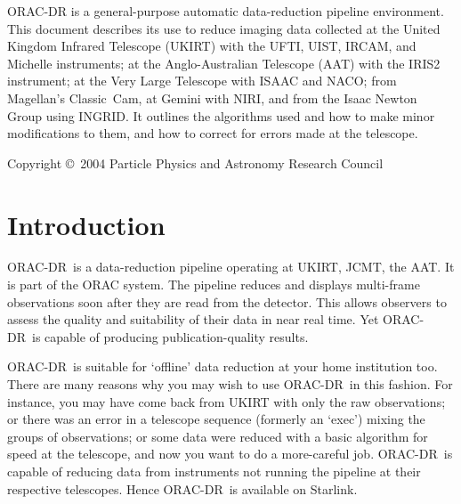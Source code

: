 \documentclass[twoside,11pt]{article}
\newcommand{\stardocinitials}  {SUN}
\newcommand{\stardocnumber}    {232.8}
\newcommand{\stardoccopyright} {Copyright \copyright\ 2004 Particle Physics and Astronomy Research Council}
\newcommand{\stardocabstract}  {{\footnotesize ORAC-DR} is a
general-purpose automatic data-reduction pipeline environment.  This
document describes its use to reduce imaging data collected at the
United Kingdom Infrared Telescope (UKIRT) with the UFTI, UIST, IRCAM,
and Michelle instruments; at the Anglo-Australian Telescope (AAT) with
the IRIS2 instrument; at the Very Large Telescope with ISAAC and NACO;
from Magellan's Classic~Cam, at Gemini with NIRI, and from the Isaac
Newton Group using INGRID.  It outlines the algorithms used and how to
make minor modifications to them, and how to correct for errors made
at the telescope.}
\newcommand{\stardocname}{\stardocinitials /\stardocnumber}
\newcommand{\htmladdnormallink}[2]{#1}
\newenvironment{latexonly}{}{}
\newcommand{\xlabel}[1]{}
\renewcommand{\_}{\texttt{\symbol{95}}}
\newcommand{\ORACDR}{{\footnotesize ORAC-DR}}
\newcommand{\AAT}{\htmladdnormallink{AAT}{http://www.aao.gov.au/}}
\newcommand{\JCMT}{\htmladdnormallink{JCMT}{http://www.jach.hawaii.edu/JACpublic/JCMT/}}
\newcommand{\UKIRT}{\htmladdnormallink{UKIRT}{http://www.jach.hawaii.edu/JACpublic/UKIRT/}}
\renewcommand{\thepage}{\roman{page}}
\begin{document}
\stardocabstract

\begin{latexonly}
\newpage
\vspace*{\fill}
\stardoccopyright
\end{latexonly}

  \newpage
  \begin{latexonly}
    \setlength{\parskip}{0mm}
    \tableofcontents
    \setlength{\parskip}{\medskipamount}
    \markboth{\stardocname}{\stardocname}
  \end{latexonly}
\cleardoublepage
\renewcommand{\thepage}{\arabic{page}}
\setcounter{page}{1}

\section{\xlabel{introduction}Introduction\label{introduction}}

\ORACDR\ is a data-reduction pipeline operating at \UKIRT, \JCMT,
the \AAT.  It is part of the
\htmladdnormallink{ORAC system}{http://www.stsci.edu/stsci/meetings/adassVII/bridgera.html}.
The pipeline reduces and displays multi-frame
observations soon after they are read from the detector.  This allows
observers to assess the quality and suitability of their data in near
real time.  Yet \ORACDR\ is capable of producing publication-quality
results.  

\ORACDR\ is suitable for `offline' data reduction at your home
institution too.  There are many reasons why you may wish to use
\ORACDR\ in this fashion.  For instance, you may have come back from
UKIRT with only the raw observations; or there was an error in a
telescope sequence (formerly an `exec') mixing the groups of
observations; or some data were reduced with a basic algorithm for
speed at the telescope, and now you want to do a more-careful job.
\ORACDR\ is capable of reducing data from instruments not running the
pipeline at their respective telescopes.  Hence \ORACDR\ is available
on Starlink.
\end{document}
